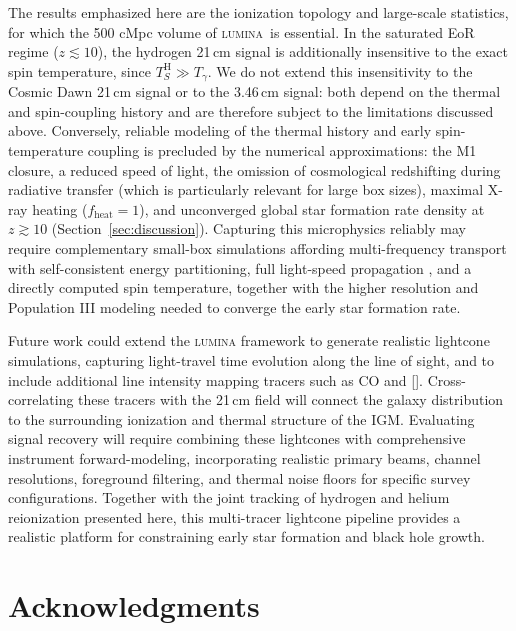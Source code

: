 \documentclass[apj,twocolumn, appendixfloats, twocolappendix, numberedappendix, tighten]{openjournal}
\DeclareRobustCommand{\lumina}{\mbox{\textsc{lumina}}\xspace}
\begin{document}
The results emphasized here are the ionization topology and large-scale statistics, for which the 500 cMpc volume of \lumina\ is essential. In the saturated EoR regime ($z \lesssim 10$), the hydrogen 21\,cm signal is additionally insensitive to the exact spin temperature, since $T_S^\mathrm{H} \gg T_\gamma$. We do not extend this insensitivity to the Cosmic Dawn 21\,cm signal or to the 3.46\,cm signal: both depend on the thermal and spin-coupling history and are therefore subject to the limitations discussed above. Conversely, reliable modeling of the thermal history and early spin-temperature coupling is precluded by the numerical approximations: the M1 closure, a reduced speed of light, the omission of cosmological redshifting during radiative transfer (which is particularly relevant for large box sizes), maximal X-ray heating ($f_\mathrm{heat}=1$), and unconverged global star formation rate density at $z \gtrsim 10$ (Section~\ref{sec:discussion}). Capturing this microphysics reliably may require complementary small-box simulations affording multi-frequency transport with self-consistent energy partitioning, full light-speed propagation \citep[e.g.,][]{Gnedin2026}, and a directly computed spin temperature, together with the higher resolution \citep[][]{Kannan2025} and Population III modeling \citep[e.g.][]{Saha2026} needed to converge the early star formation rate.


Future work could extend the \lumina framework to generate realistic lightcone simulations, capturing light-travel time evolution along the line of sight, and to include additional line intensity mapping tracers such as CO and []. Cross-correlating these tracers with the 21\,cm field will connect the galaxy distribution to the surrounding ionization and thermal structure of the IGM. Evaluating signal recovery will require combining these lightcones with comprehensive instrument forward-modeling, incorporating realistic primary beams, channel resolutions, foreground filtering, and thermal noise floors for specific survey configurations. Together with the joint tracking of hydrogen and helium reionization presented here, this multi-tracer lightcone pipeline provides a realistic platform for constraining early star formation and black hole growth.


\section*{Acknowledgments}
\end{document}
